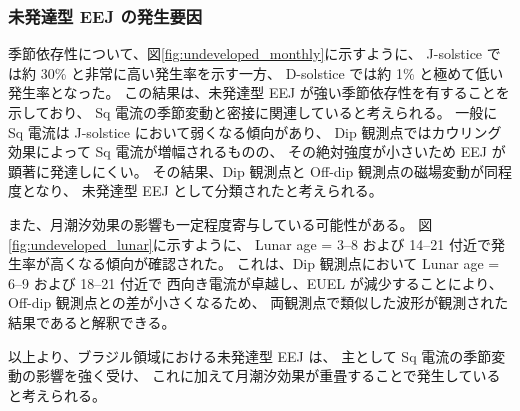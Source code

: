 \subsubsection{未発達型 EEJ の発生要因}
\label{sec:discussion_brazil_undeveloped}

季節依存性について、図\ref{fig:undeveloped_monthly}に示すように、
J-solstice では約 30\% と非常に高い発生率を示す一方、
D-solstice では約 1\% と極めて低い発生率となった。
この結果は、未発達型 EEJ が強い季節依存性を有することを示しており、
Sq 電流の季節変動と密接に関連していると考えられる。
一般に Sq 電流は J-solstice において弱くなる傾向があり、
Dip 観測点ではカウリング効果によって Sq 電流が増幅されるものの、
その絶対強度が小さいため EEJ が顕著に発達しにくい。
その結果、Dip 観測点と Off-dip 観測点の磁場変動が同程度となり、
未発達型 EEJ として分類されたと考えられる。

また、月潮汐効果の影響も一定程度寄与している可能性がある。
図\ref{fig:undeveloped_lunar}に示すように、
Lunar age = 3--8 および 14--21 付近で発生率が高くなる傾向が確認された。
これは、Dip 観測点において Lunar age = 6--9 および 18--21 付近で
西向き電流が卓越し、EUEL が減少することにより、
Off-dip 観測点との差が小さくなるため、
両観測点で類似した波形が観測された結果であると解釈できる。

以上より、ブラジル領域における未発達型 EEJ は、
主として Sq 電流の季節変動の影響を強く受け、
これに加えて月潮汐効果が重畳することで発生していると考えられる。
